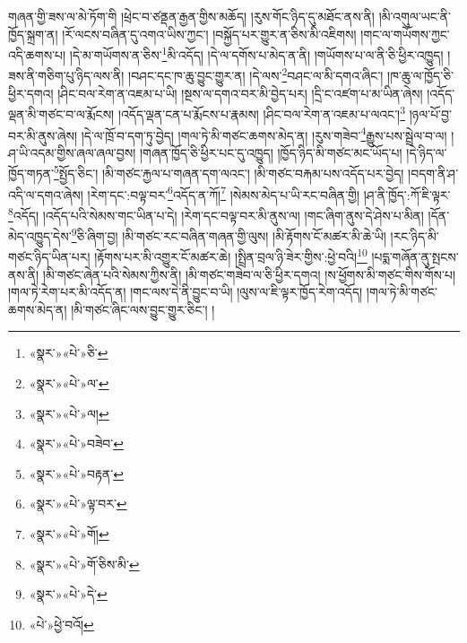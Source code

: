 གཞན་གྱི་ཟས་ལ་མེ་ཏོག་གི །ཕྲེང་བ་ཙནྡན་རྒྱན་གྱིས་མཆོད། །རུས་གོང་ཉིད་དུ་མཐོང་ནས་ནི། །མི་འགུལ་ཡང་ནི་ཁྱོད་སྐྲག་ན། །རོ་ལངས་བཞིན་དུ་འགའ་ཡིས་ཀྱང་། །བསྐྱོད་པར་གྱུར་ན་ཅིས་མི་འཇིགས། །གང་ལ་གཡོགས་ཀྱང་འདི་ཆགས་པ། །དེ་མ་གཡོགས་ན་ཅིས་\footnote{«སྣར་»«པེ་»ཅི་}མི་འདོད། །དེ་ལ་དགོས་པ་མེད་ན་ནི། །གཡོགས་པ་ལ་ནི་ཅི་ཕྱིར་འཁྱུད། །ཟས་ནི་གཅིག་པུ་ཉིད་ལས་ནི། །བཤང་དང་ཁ་ཆུ་བྱུང་གྱུར་ན། །དེ་ལས་\footnote{«སྣར་»«པེ་»ལ་}བཤང་ལ་མི་དགའ་ཞིང་། །ཁ་ཆུ་ལ་ཁྱོད་ཅི་ཕྱིར་དགའ། །ཤིང་བལ་རེག་ན་འཇམ་པ་ཡི། །སྔས་ལ་དགའ་བར་མི་བྱེད་པར། །དྲི་ང་འཛག་པ་མ་ཡིན་ཞེས། །འདོད་ལྡན་མི་གཙང་བ་ལ་རྨོངས། །འདོད་ལྡན་ངན་པ་རྨོངས་པ་རྣམས། །ཤིང་བལ་རེག་ན་འཇམ་པ་ལའང་།\footnote{«སྣར་»«པེ་»ལ།} །ཉལ་པོ་བྱ་བར་མི་ནུས་ཞེས། །དེ་ལ་ཁྲོ་བ་དག་ཏུ་བྱེད། །གལ་ཏེ་མི་གཙང་ཆགས་མེད་ན། །རུས་གཟེབ་\footnote{«སྣར་»«པེ་»བཟེབ་}རྒྱུས་པས་སྦྲེལ་བ་ལ། །ཤ་ཡི་འདམ་གྱིས་ཞལ་ཞལ་བྱས། །གཞན་ཁྱོད་ཅི་ཕྱིར་པང་དུ་འཁྱུད། །ཁྱོད་ཉིད་མི་གཙང་མང་ཡོད་པ། །དེ་ཉིད་ལ་ཁྱོད་གཏན་\footnote{«སྣར་»«པེ་»བརྟན་}སྤྱོད་ཅིང་། །མི་གཙང་རྐྱལ་པ་གཞན་དག་ལའང་། །མི་གཙང་བརྐམ་པས་འདོད་པར་བྱེད། །བདག་ནི་ཤ་འདི་ལ་དགའ་ཞེས། །རེག་དང་:བལྟ་བར་\footnote{«སྣར་»«པེ་»ལྟ་བར་}འདོད་ན་ཀོ།\footnote{«སྣར་»«པེ་»གོ།} །སེམས་མེད་པ་ཡི་རང་བཞིན་གྱི། །ཤ་ནི་ཁྱོད་:ཀོ་ཇི་ལྟར་\footnote{«སྣར་»«པེ་»གོ་ཅིས་མི་}འདོད། །འདོད་པའི་སེམས་གང་ཡིན་པ་དེ། །རེག་དང་བལྟ་བར་མི་ནུས་ལ། །གང་ཞིག་ནུས་དེ་ཤེས་པ་མིན། །དོན་མེད་འཁྱུད་དེས་\footnote{«སྣར་»«པེ་»དེ་}ཅི་ཞིག་བྱ། །མི་གཙང་རང་བཞིན་གཞན་གྱི་ལུས། །མི་རྟོགས་ངོ་མཚར་མི་ཆེ་ཡི། །རང་ཉིད་མི་གཙང་ཉིད་ཡིན་པར། །རྟོགས་པར་མི་འགྱུར་ངོ་མཚར་ཆེ། །སྤྲིན་བྲལ་ཉི་ཟེར་གྱིས་:ཕྱེ་བའི།\footnote{«པེ་»ཕྱེ་བའོ།} །པདྨ་གཞོན་ནུ་སྤངས་ནས་ནི། །མི་གཙང་ཞེན་པའི་སེམས་ཀྱིས་ནི། །མི་གཙང་གཟེབ་ལ་ཅི་ཕྱིར་དགའ། །ས་ཕྱོགས་མི་གཙང་གིས་གོས་པ། །གལ་ཏེ་རེག་པར་མི་འདོད་ན། །གང་ལས་དེ་ནི་བྱུང་བ་ཡི། །ལུས་ལ་ཇི་ལྟར་ཁྱོད་རེག་འདོད། །གལ་ཏེ་མི་གཙང་ཆགས་མེད་ན། །མི་གཙང་ཞིང་ལས་བྱུང་གྱུར་ཅིང་། །
